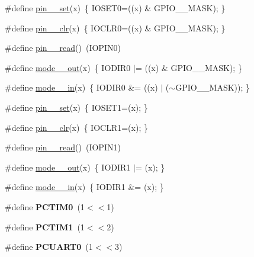 \begin{DoxyCompactItemize}
\item 
\#define \hyperlink{group___hardware_ga222a159c351bf50439a89772e143225c}{pin\-\_\-\_\-set}(x)~\{ I\-O\-S\-E\-T0=((x) \& G\-P\-I\-O\-\_\-\_\-\-M\-A\-S\-K); \}
\item 
\#define \hyperlink{group___hardware_ga0ed22ee93c03a21514f8e924e2bb4c0a}{pin\-\_\-\_\-clr}(x)~\{ I\-O\-C\-L\-R0=((x) \& G\-P\-I\-O\-\_\-\_\-\-M\-A\-S\-K); \}
\item 
\#define \hyperlink{group___hardware_ga50e5a6940e188e0fa4c83fbc2f27c207}{pin\-\_\-\_\-read}()~(I\-O\-P\-I\-N0)
\item 
\#define \hyperlink{group___hardware_gad9fbd1103850090358db08bd264d022d}{mode\-\_\-\_\-out}(x)~\{ I\-O\-D\-I\-R0 $\vert$= ((x) \& G\-P\-I\-O\-\_\-\_\-\-M\-A\-S\-K); \}
\item 
\#define \hyperlink{group___hardware_ga5fe1c6e4e77acb3a1dd3859c2b72c9d5}{mode\-\_\-\_\-in}(x)~\{ I\-O\-D\-I\-R0 \&= ((x) $\vert$ ($\sim$G\-P\-I\-O\-\_\-\_\-\-M\-A\-S\-K)); \}
\item 
\#define \hyperlink{group___hardware_ga4785173bcae0c293591a666ea99a9680}{pin\-\_\-\_\-set}(x)~\{ I\-O\-S\-E\-T1=(x); \}
\item 
\#define \hyperlink{group___hardware_gaf672b946469f63f54cbe46830600f236}{pin\-\_\-\_\-clr}(x)~\{ I\-O\-C\-L\-R1=(x); \}
\item 
\#define \hyperlink{group___hardware_gaf5709fa8a29f0546ebcc4f2f75d97acb}{pin\-\_\-\_\-read}()~(I\-O\-P\-I\-N1)
\item 
\#define \hyperlink{group___hardware_gac0e495a90072556ec081d20d07d62539}{mode\-\_\-\_\-out}(x)~\{ I\-O\-D\-I\-R1 $\vert$= (x); \}
\item 
\#define \hyperlink{group___hardware_ga4e7d3157cae95d27c8c806670c23e5d7}{mode\-\_\-\_\-in}(x)~\{ I\-O\-D\-I\-R1 \&= (x); \}
\item 
\hypertarget{group___hardware_ga527ec38c1ff74c1aab8cb74637cabb21}{\#define {\bfseries P\-C\-T\-I\-M0}~(1$<$$<$1)}\label{group___hardware_ga527ec38c1ff74c1aab8cb74637cabb21}

\item 
\hypertarget{group___hardware_ga8078d4303b5e40be680353814bf6fc35}{\#define {\bfseries P\-C\-T\-I\-M1}~(1$<$$<$2)}\label{group___hardware_ga8078d4303b5e40be680353814bf6fc35}

\item 
\hypertarget{group___hardware_ga205a29404ea45b8c07ec1617b3961e2d}{\#define {\bfseries P\-C\-U\-A\-R\-T0}~(1$<$$<$3)}\label{group___hardware_ga205a29404ea45b8c07ec1617b3961e2d}


\end{DoxyCompactItemize}
